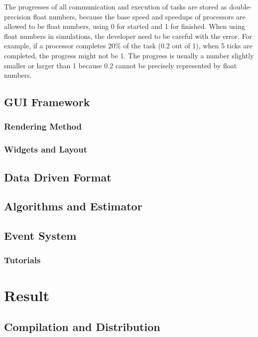 \documentclass[msc,deptreport, cs]{infthesis}
\begin{document}
The progresses of all communication and execution of tasks are stored as double-precision float numbers, because the base speed and speedups of processors are allowed to be float numbers, using 0 for started and 1 for finished. When using float numbers in simulations, the developer need to be careful with the error. For example, if a processor completes 20\% of the task (0.2 out of 1), when 5 ticks are completed, the progress might not be 1. The progress is usually a number slightly smaller or larger than 1 because 0.2 cannot be precisely represented by float numbers.



\section{GUI Framework}

\subsection{Rendering Method}

\subsection{Widgets and Layout}

\section{Data Driven Format}

\section{Algorithms and Estimator}

\section{Event System}

\subsection{Tutorials}

\chapter{Result}

\section{Compilation and Distribution}
\end{document}

